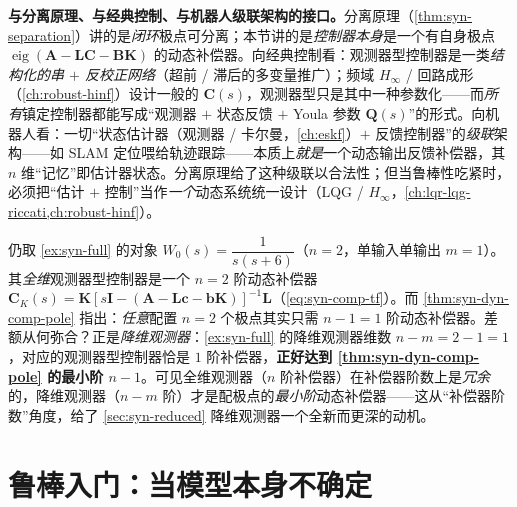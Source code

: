 \begin{insight}
\textbf{与分离原理、与经典控制、与机器人级联架构的接口。}\;分离原理（\cref{thm:syn-separation}）讲的是\emph{闭环}极点可分离；本节讲的是\emph{控制器本身}是一个有自身极点 $\operatorname{eig}(\mathbf A-\mathbf L\mathbf C-\mathbf B\mathbf K)$ 的动态补偿器。向经典控制看：观测器型控制器是一类\emph{结构化的串 $+$ 反校正网络}（超前 / 滞后的多变量推广）；频域 $H_\infty$ / 回路成形（\cref{ch:robust-hinf}）设计一般的 $\mathbf C(s)$，观测器型只是其中一种参数化——而\emph{所有}镇定控制器都能写成“观测器 $+$ 状态反馈 $+$ Youla 参数 $\mathbf Q(s)$”的形式\cite{chen1999linear}。向机器人看：一切“状态估计器（观测器 / 卡尔曼，\cref{ch:eskf}）$+$ 反馈控制器”的\emph{级联}架构——如 SLAM 定位喂给轨迹跟踪——本质上\emph{就是}一个动态输出反馈补偿器，其 $n$ 维“记忆”即估计器状态。分离原理给了这种级联以合法性；但当鲁棒性吃紧时，必须把“估计 $+$ 控制”当作\emph{一个}动态系统统一设计（LQG / $H_\infty$，\cref{ch:lqr-lqg-riccati,ch:robust-hinf}）。
\end{insight}

\begin{example}[观测器型控制器的补偿器阶数]
\label{ex:syn-compensator}
仍取 \cref{ex:syn-full} 的对象 $W_0(s)=\dfrac1{s(s+6)}$（$n=2$，单输入单输出 $m=1$）。其\emph{全维}观测器型控制器是一个 $n=2$ 阶动态补偿器 $\mathbf C_K(s)=\mathbf K[s\mathbf I-(\mathbf A-\mathbf L\mathbf c-\mathbf b\mathbf K)]^{-1}\mathbf L$（\cref{eq:syn-comp-tf}）。而 \cref{thm:syn-dyn-comp-pole} 指出：\emph{任意}配置 $n=2$ 个极点其实只需 $n-1=1$ 阶动态补偿器。差额从何弥合？正是\emph{降维观测器}：\cref{ex:syn-full} 的降维观测器维数 $n-m=2-1=1$，对应的观测器型控制器恰是 $1$ 阶补偿器，\textbf{正好达到 \cref{thm:syn-dyn-comp-pole} 的最小阶 $n-1$}。可见全维观测器（$n$ 阶补偿器）在补偿器阶数上是\emph{冗余}的，降维观测器（$n-m$ 阶）才是配极点的\emph{最小阶}动态补偿器——这从“补偿器阶数”角度，给了 \cref{sec:syn-reduced} 降维观测器一个全新而更深的动机。
\end{example}

\section{鲁棒入门：当模型本身不确定}
\label{sec:syn-robust}

